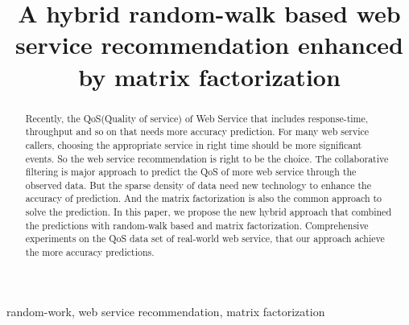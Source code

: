 \documentclass[conference]{IEEEtran}
\begin{document}
\title{A hybrid random-walk based web service recommendation enhanced by matrix factorization}

\author{
  \and
}

\maketitle

\begin{abstract}
Recently, the QoS(Quality of service) of Web Service that includes response-time, throughput and so on that needs more accuracy prediction. For many web service  callers, choosing the appropriate service in right time should be more significant events. So the web service recommendation is right to be the choice. The collaborative filtering is major approach to predict the QoS of more web service through the observed data. But the sparse density of data need new technology to enhance the accuracy of prediction. And the matrix factorization is also the common approach to solve the prediction. In this paper, we propose the new hybrid approach that combined the predictions with random-walk based and matrix factorization. Comprehensive experiments on the QoS data set of real-world web service, that our approach achieve the more accuracy predictions.
\end{abstract}

\begin{IEEEkeywords}
  random-work, web service recommendation, matrix factorization
\end{IEEEkeywords}

\IEEEpeerreviewmaketitle

\end{document}
